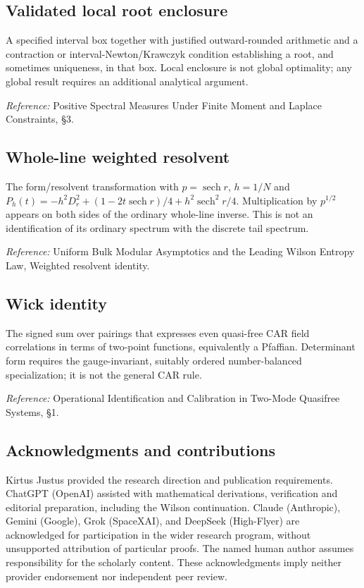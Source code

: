 \documentclass[
  10pt,
  a4paper,
]{article}
\begin{document}
\subsection{Validated local root enclosure}\label{validated-local-root-enclosure}

A specified interval box together with justified outward-rounded arithmetic and a contraction or interval-Newton/Krawczyk condition establishing a root, and sometimes uniqueness, in that box. Local enclosure is not global optimality; any global result requires an additional analytical argument.

\nopagebreak[4]

\emph{Reference:} Positive Spectral Measures Under Finite Moment and Laplace Constraints, §3.

\subsection{Whole-line weighted resolvent}\label{whole-line-weighted-resolvent}

The form/resolvent transformation with \(p=\operatorname{sech}r\), \(h=1/N\) and \(P_h(t)=-h^2D_r^2+(1-2t\operatorname{sech}r)/4+h^2\operatorname{sech}^2r/4\). Multiplication by \(p^{1/2}\) appears on both sides of the ordinary whole-line inverse. This is not an identification of its ordinary spectrum with the discrete tail spectrum.

\nopagebreak[4]

\emph{Reference:} Uniform Bulk Modular Asymptotics and the Leading Wilson Entropy Law, Weighted resolvent identity.

\subsection{Wick identity}\label{wick-identity}

The signed sum over pairings that expresses even quasi-free CAR field correlations in terms of two-point functions, equivalently a Pfaffian. Determinant form requires the gauge-invariant, suitably ordered number-balanced specialization; it is not the general CAR rule.

\nopagebreak[4]

\emph{Reference:} Operational Identification and Calibration in Two-Mode Quasifree Systems, §1.

\subsection{Acknowledgments and contributions}\label{acknowledgments-and-contributions}

Kirtus Justus provided the research direction and publication requirements. ChatGPT (OpenAI) assisted with mathematical derivations, verification and editorial preparation, including the Wilson continuation. Claude (Anthropic), Gemini (Google), Grok (SpaceXAI), and DeepSeek (High-Flyer) are acknowledged for participation in the wider research program, without unsupported attribution of particular proofs. The named human author assumes responsibility for the scholarly content. These acknowledgments imply neither provider endorsement nor independent peer review.
\end{document}
